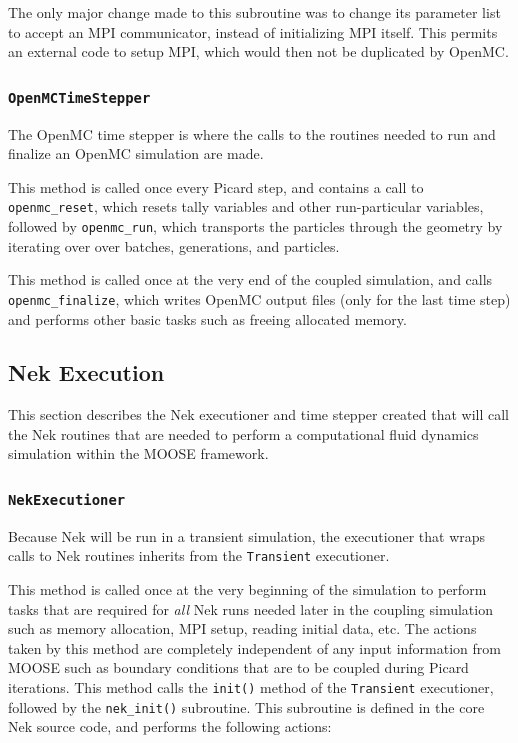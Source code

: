\documentclass[10pt]{article}
\newcounter{subsubsubsection}[subsubsection]
\numberwithin{equation}{section} %
\begin{document}
The only major change made to this subroutine was to change its parameter list to accept an MPI communicator, instead of initializing MPI itself. This permits an external code to setup MPI, which would then not be duplicated by OpenMC.

\subsubsection{{\tt OpenMCTimeStepper}}
The OpenMC time stepper is where the calls to the routines needed to run and finalize an OpenMC simulation are made.

This method is called once every Picard step, and contains a call to {\tt openmc\_reset}, which resets tally variables and other run-particular variables, followed by {\tt openmc\_run}, which transports the particles through the geometry by iterating over over batches, generations, and particles. 

This method is called once at the very end of the coupled simulation, and calls {\tt openmc\_finalize}, which writes OpenMC output files (only for the last time step) and performs other basic tasks such as freeing allocated memory.

\subsection{Nek Execution}
This section describes the Nek executioner and time stepper created that will call the Nek routines that are needed to perform a computational fluid dynamics simulation within the MOOSE framework.

\subsubsection{{\tt NekExecutioner}}
Because Nek will be run in a transient simulation, the executioner that wraps calls to Nek routines inherits from the {\tt Transient} executioner.

This method is called once at the very beginning of the simulation to perform tasks that are required for {\it all} Nek runs needed later in the coupling simulation such as memory allocation, MPI setup, reading initial data, etc. The actions taken by this method are completely independent of any input information from MOOSE such as boundary conditions that are to be coupled during Picard iterations. This method calls the {\tt init()} method of the {\tt Transient} executioner, followed by the {\tt nek\_init()} subroutine. This subroutine is defined in the core Nek source code, and performs the following actions:
\end{document}
